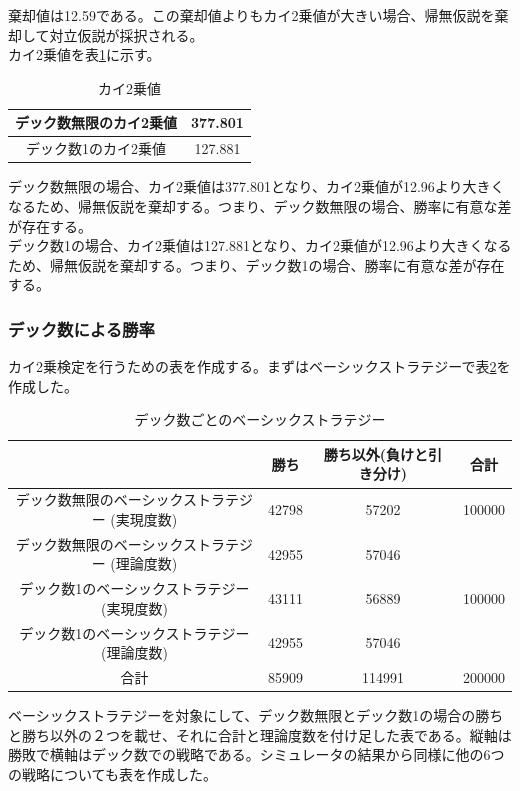 棄却値は12.59である。この棄却値よりもカイ2乗値が大きい場合、帰無仮説を棄却して対立仮説が採択される。\\
カイ2乗値を表\ref{value1}に示す。
\begin{table}[H]
 \caption{カイ2乗値\label{value1}}
 \begin{center}
  \begin{tabular}{|c|c|}
   \hline デック数無限のカイ2乗値 & 377.801 \\
 \hline デック数1のカイ2乗値 & 127.881 \\
 \hline 
  \end{tabular}
 \end{center}
\end{table}
デック数無限の場合、カイ2乗値は377.801となり、カイ2乗値が12.96より大きくなるため、帰無仮説を棄却する。つまり、デック数無限の場合、勝率に有意な差が存在する。\\
 デック数1の場合、カイ2乗値は127.881となり、カイ2乗値が12.96より大きくなるため、帰無仮説を棄却する。つまり、デック数1の場合、勝率に有意な差が存在する。
\subsubsection{デック数による勝率}
カイ2乗検定を行うための表を作成する。まずはベーシックストラテジーで表\ref{deckbs}を作成した。
\begin{table}[H]
 \caption{デック数ごとのベーシックストラテジー\label{deckbs}}
 \begin{center}
  \begin{tabular}{|c|c|c|c|}
    \hline
      & 勝ち & 勝ち以外(負けと引き分け) & 合計 \\
    \hline デック数無限のベーシックストラテジー (実現度数)& 42798 & 57202 & 100000 \\
            デック数無限のベーシックストラテジー (理論度数)& 42955 & 57046 &  \\
    \hline デック数1のベーシックストラテジー (実現度数)& 43111 & 56889 & 100000 \\
            デック数1のベーシックストラテジー (理論度数)& 42955 & 57046 &  \\
    \hline  合計 & 85909 & 114991 & 200000 \\
    \hline
  \end{tabular}
 \end{center}
\end{table}
ベーシックストラテジーを対象にして、デック数無限とデック数1の場合の勝ちと勝ち以外の２つを載せ、それに合計と理論度数を付け足した表である。縦軸は勝敗で横軸はデック数での戦略である。シミュレータの結果から同様に他の6つの戦略についても表を作成した。

